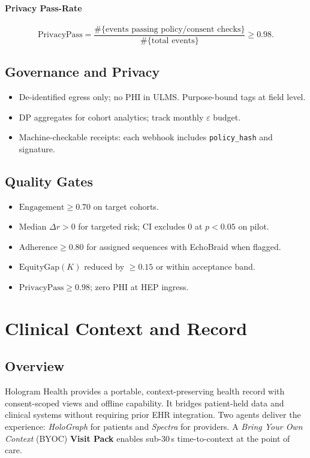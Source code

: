 \documentclass[11pt]{article}
\theoremstyle{plain}
\begin{document}
\paragraph{Privacy Pass-Rate}
\[
\mathrm{PrivacyPass}=\frac{\#\{\text{events passing policy/consent checks}\}}
{\#\{\text{total events}\}} \ge 0.98.
\]

\subsection{Governance and Privacy}
\begin{itemize}
  \item De-identified egress only; no PHI in ULMS. Purpose-bound tags at field level.
  \item DP aggregates for cohort analytics; track monthly $\varepsilon$ budget.
  \item Machine-checkable receipts: each webhook includes \texttt{policy\_hash} and signature.
\end{itemize}

\subsection{Quality Gates}
\begin{itemize}
  \item $\mathrm{Engagement}\ge 0.70$ on target cohorts.
  \item Median $\Delta r>0$ for targeted risk; CI excludes 0 at $p<0.05$ on pilot.
  \item $\mathrm{Adherence}\ge 0.80$ for assigned sequences with EchoBraid when flagged.
  \item $\mathrm{EquityGap}(K)$ reduced by $\ge 0.15$ or within acceptance band.
  \item $\mathrm{PrivacyPass}\ge 0.98$; zero PHI at HEP ingress.
\end{itemize}


\section{Clinical Context and Record}

\subsection{Overview}
Hologram Health provides a portable, context-preserving health record with consent-scoped views and offline capability. It bridges patient-held data and clinical systems without requiring prior EHR integration. Two agents deliver the experience: \emph{HoloGraph} for patients and \emph{Spectra} for providers. A \emph{Bring Your Own Context} (BYOC) \textbf{Visit Pack} enables sub-30\,s time-to-context at the point of care.
\end{document}
